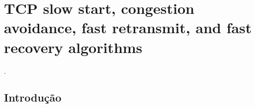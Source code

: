 
\chapter{TCP slow start, congestion avoidance, fast retransmit, and fast recovery algorithms}
 \cite{stevens1997tcp}.


\section*{Introdução}
